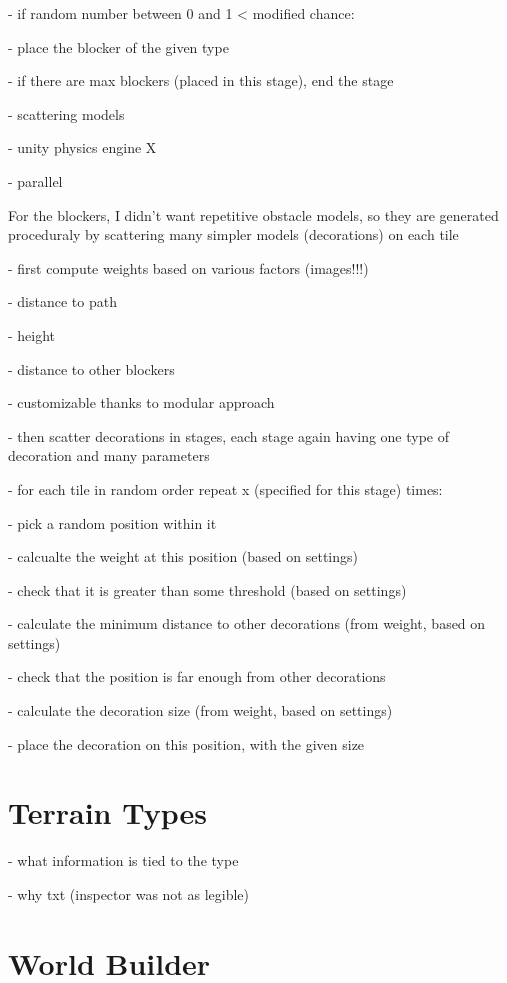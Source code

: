 - if random number between 0 and 1 < modified chance:

- place the blocker of the given type

- if there are max blockers (placed in this stage), end the stage

- scattering models

- unity physics engine X

- parallel

For the blockers, I didn't want repetitive obstacle models, so they are generated proceduraly by scattering many simpler models (decorations) on each tile

- first compute weights based on various factors (images!!!)

- distance to path

- height

- distance to other blockers

- customizable thanks to modular approach

- then scatter decorations in stages, each stage again having one type of decoration and many parameters

- for each tile in random order repeat x (specified for this stage) times:

- pick a random position within it

- calcualte the weight at this position (based on settings)

- check that it is greater than some threshold (based on settings)

- calculate the minimum distance to other decorations (from weight, based on settings)

- check that the position is far enough from other decorations

- calculate the decoration size (from weight, based on settings)

- place the decoration on this position, with the given size

\section{Terrain Types}

- what information is tied to the type

- why txt (inspector was not as legible)

\section{World Builder}

